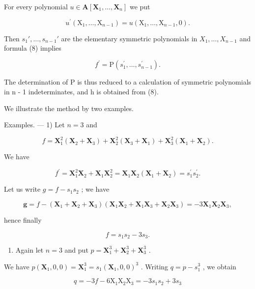 For every polynomial \(u \in \mathbf{A}[\mathbf{X}_1, \ldots, \mathbf{X}_n]\) we put

\[
u ^ {\prime} \left(\mathrm{X} _ {1}, \dots , \mathrm{X} _ {n - 1}\right) = u \left(\mathrm{X} _ {1}, \dots , \mathrm{X} _ {n - 1}, 0\right).
\]

Then \(s_1', \ldots, s_{n-1}'\) are the elementary symmetric polynomials in \(X_1, \ldots, X_{n-1}\) and formula (8) implies

\[
f ^ {\prime} = \mathrm{P} \left(s _ {1} ^ {\prime}, \dots , s _ {n - 1} ^ {\prime}\right).
\]

The determination of P is thus reduced to a calculation of symmetric polynomials in n - 1 indeterminates, and h is obtained from (8).

We illustrate the method by two examples.

Examples. --- 1) Let \(n = 3\) and

\[
f = \mathbf {X} _ {1} ^ {2} (\mathbf {X} _ {2} + \mathbf {X} _ {3}) + \mathbf {X} _ {2} ^ {2} (\mathbf {X} _ {3} + \mathbf {X} _ {1}) + \mathbf {X} _ {3} ^ {2} (\mathbf {X} _ {1} + \mathbf {X} _ {2}).
\]

We have

\[
f ^ {\prime} = \mathbf {X} _ {1} ^ {2} \mathbf {X} _ {2} + \mathbf {X} _ {1} \mathbf {X} _ {2} ^ {2} = \mathbf {X} _ {1} \mathbf {X} _ {2} (\mathbf {X} _ {1} + \mathbf {X} _ {2}) = s _ {1} ^ {\prime} s _ {2} ^ {\prime}.
\]

Let us write \(g = f - s_1s_2\) ; we have

\[
\boldsymbol {g} = f - \left(\mathbf {X} _ {1} + \mathbf {X} _ {2} + \mathbf {X} _ {3}\right) \left(\mathbf {X} _ {1} \mathbf {X} _ {2} + \mathbf {X} _ {1} \mathbf {X} _ {3} + \mathbf {X} _ {2} \mathbf {X} _ {3}\right) = - 3 \mathbf {X} _ {1} \mathbf {X} _ {2} \mathbf {X} _ {3},
\]

hence finally

\[
f = s _ {1} s _ {2} - 3 s _ {3}.
\]

\begin{enumerate}
\def\labelenumi{\arabic{enumi})}
\setcounter{enumi}{1}
\tightlist
\item
  Again let \(n = 3\) and put \(p = \mathbf{X}_1^3 + \mathbf{X}_2^3 + \mathbf{X}_3^3\) .
\end{enumerate}

We have \(p(\mathbf{X}_1, 0, 0) = \mathbf{X}_1^3 = s_1(\mathbf{X}_1, 0, 0)^3\) . Writing \(q = p - s_1^3\) , we obtain

\[
q = - 3 f - 6 \mathrm{X} _ {1} \mathrm{X} _ {2} \mathrm{X} _ {3} = - 3 s _ {1} s _ {2} + 3 s _ {3}
\]

